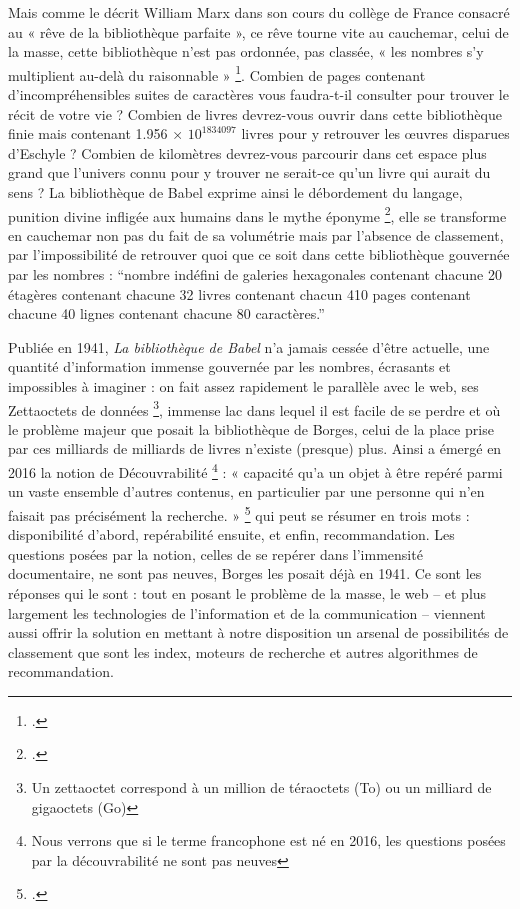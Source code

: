 \documentclass[a4paper,12pt,twoside]{book}
\begin{document}
	Mais comme le décrit William Marx dans son cours du collège de France consacré au « rêve de la bibliothèque parfaite », ce rêve tourne vite au cauchemar, celui de la masse, cette bibliothèque n’est pas ordonnée, pas classée, « les nombres s’y multiplient au-delà du raisonnable » \footcite{marx}. Combien de pages contenant d’incompréhensibles suites de caractères vous faudra-t-il consulter pour trouver le récit de votre vie ? Combien de livres devrez-vous ouvrir dans cette bibliothèque finie mais contenant 1.956 × $10^{1834097}$ livres pour y retrouver les œuvres disparues d’Eschyle ? Combien de kilomètres devrez-vous parcourir dans cet espace plus grand que l’univers connu pour y trouver ne serait-ce qu’un livre qui aurait du sens ? La bibliothèque de Babel exprime ainsi le débordement du langage, punition divine infligée aux humains dans le mythe éponyme \footcite{zotero-393}, elle se transforme en cauchemar non pas du fait de sa volumétrie mais par l’absence de classement, par l’impossibilité de retrouver quoi que ce soit dans cette bibliothèque gouvernée par les nombres : \enquote{nombre indéfini de galeries hexagonales contenant chacune 20 étagères contenant chacune 32 livres contenant chacun 410 pages contenant chacune 40 lignes contenant chacune 80 caractères.}
	
	Publiée en 1941, \textit{La bibliothèque de Babel} n’a jamais cessée d’être actuelle, une quantité d’information immense gouvernée par les nombres, écrasants et impossibles à imaginer : on fait assez rapidement le parallèle avec le web, ses Zettaoctets de données \footnote{Un zettaoctet correspond à un million de téraoctets (To) ou un milliard de gigaoctets (Go)}, immense lac dans lequel il est facile de se perdre et où le problème majeur que posait la bibliothèque de Borges, celui de la place prise par ces milliards de milliards de livres n’existe (presque) plus. Ainsi a émergé en 2016 la notion de Découvrabilité \footnote{Nous verrons que si le terme francophone est né en 2016, les questions posées par la découvrabilité ne sont pas neuves} : « capacité qu’a un objet à être repéré parmi un vaste ensemble d’autres contenus, en particulier par une personne qui n’en faisait pas précisément la recherche. » \footcite{zotero-263} qui peut se résumer en trois mots : disponibilité d’abord, repérabilité ensuite, et enfin, recommandation. Les questions posées par la notion, celles de se repérer dans l’immensité documentaire, ne sont pas neuves, Borges les posait déjà en 1941. Ce sont les réponses qui le sont : tout en posant le problème de la masse, le web – et plus largement les technologies de l’information et de la communication – viennent aussi offrir la solution en mettant à notre disposition un arsenal de possibilités de classement que sont les index, moteurs de recherche et autres algorithmes de recommandation.
	
\end{document}
